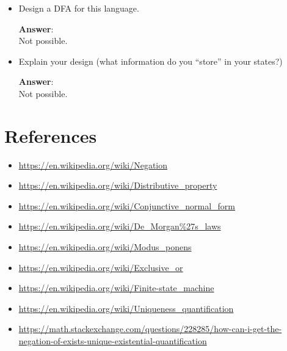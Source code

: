 \documentclass[a4paper, 14pt]{report}
\newcommand{\answer}[1]{%
	\begin{flushleft}
		\textbf{Answer}:\\
			#1
	\end{flushleft}}
\begin{document}
\begin{itemize}		
	\item Design a DFA for this language. \\
		\answer{Not possible.} 
	\item Explain your design (what information do you ``store'' in your states?) \\
		\answer{Not possible.} 
\end{itemize}

\pagebreak

\section*{References}

\begin{itemize}[noitemsep]		
  \item \url{https://en.wikipedia.org/wiki/Negation}
	\item \url{https://en.wikipedia.org/wiki/Distributive\_property}
	\item \url{https://en.wikipedia.org/wiki/Conjunctive\_normal\_form}
	\item \url{https://en.wikipedia.org/wiki/De\_Morgan\%27s\_laws}
	\item \url{https://en.wikipedia.org/wiki/Modus\_ponens}
	\item \url{https://en.wikipedia.org/wiki/Exclusive\_or}
	\item \url{https://en.wikipedia.org/wiki/Finite-state\_machine}
	\item \url{https://en.wikipedia.org/wiki/Uniqueness\_quantification}
	\item \url{https://math.stackexchange.com/questions/228285/how-can-i-get-the-negation-of-exists-unique-existential-quantification}
\end{itemize}		
\end{document}
